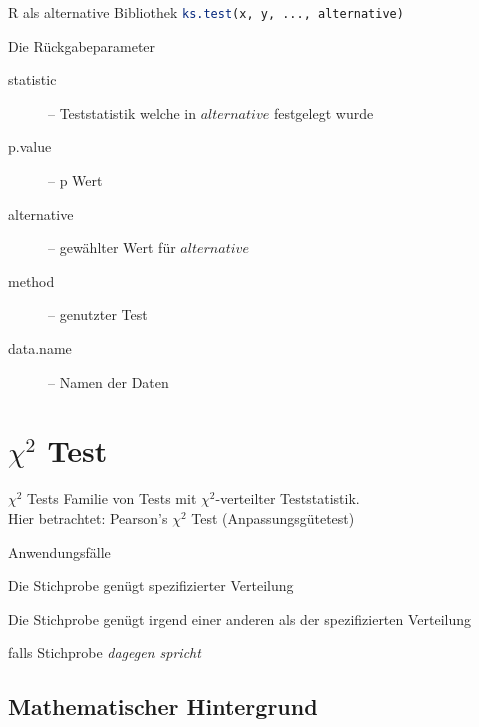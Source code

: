 \documentclass{beamer}
\begin{document}
\begin{frame}{\insertsubsection}

\begin{block}{R als alternative Bibliothek}
	\lstinline[language=R] $ks.test(x, y, ..., alternative)$
\end{block}

\begin{block}{Die Rückgabeparameter}
\begin{description}
	\item[statistic] -- Teststatistik welche in $alternative$ festgelegt wurde
	\item[p.value] -- p Wert
	\item[alternative] -- gewählter Wert für $alternative$
	\item[method] -- genutzter Test
	\item[data.name] -- Namen der Daten
\end{description}
\end{block}

\end{frame}

\section{$\chi^2$ Test}
\begin{frame}{\insertsection}
\begin{block}{$\chi^2$ Tests}
	Familie von Tests mit $\chi^2$-verteilter Teststatistik.
	\\
	Hier betrachtet: Pearson's $\chi^2$ Test (Anpassungsgütetest)
\end{block}
\begin{block}{Anwendungsfälle}
	\begin{description}[Alternativhypothese]
	\item[Nullhypothese] Die Stichprobe genügt spezifizierter Verteilung
	\item[Alternativhypothese] Die Stichprobe genügt irgend einer anderen als der spezifizierten Verteilung
	\item[Verwerfen von $H_0$] falls Stichprobe \emph{dagegen spricht}
	\end{description}
\end{block}
\end{frame}

\subsection{Mathematischer Hintergrund}
\end{document}
